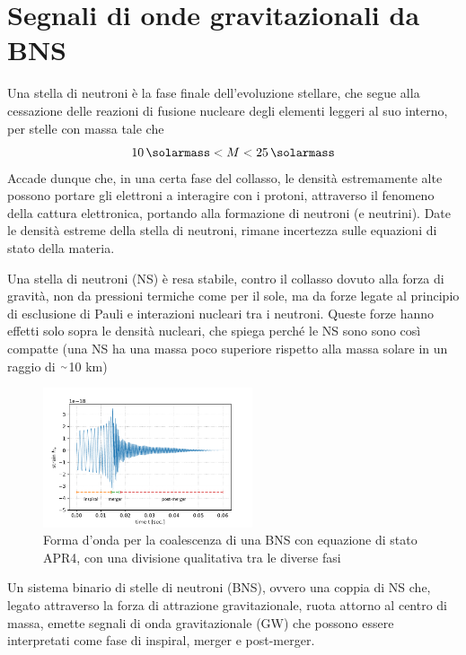 \chapter[Segnali di GW da BNS]{Segnali di onde gravitazionali da BNS}
\label{chapter:segnaleGWdaBNS}
Una stella di neutroni è la fase finale dell'evoluzione stellare, che segue alla cessazione delle reazioni di fusione nucleare degli elementi leggeri al suo interno, per stelle con massa tale che
\begin{equation}
   	\SI{10}{\solarmass} < M < \SI{25}{\solarmass}
   	\label{eqn:massNS}
\end{equation}
Accade dunque che, in una certa fase del collasso, le densità estremamente alte possono portare gli elettroni a interagire con i protoni, attraverso il fenomeno della cattura elettronica, portando alla formazione di neutroni (e neutrini). Date le densità estreme della stella di neutroni, rimane incertezza sulle equazioni di stato della materia.\cite{hobson2006general}

Una stella di neutroni (NS) è resa stabile, contro il collasso dovuto alla forza di gravità, non da pressioni termiche come per il sole, ma da forze legate al principio di esclusione di Pauli e interazioni nucleari tra i neutroni. Queste forze hanno effetti solo sopra le densità nucleari, che spiega perché le NS sono sono così compatte (una NS ha una massa poco superiore rispetto alla massa solare in un raggio di $\smallsim$10 km)\cite{hartle2003gravity}
\begin{figure}
	\vspace{-15pt}
	\begin{center}
		\includegraphics[width=0.55\textwidth]{figures/Capitolo_1/APR4.pdf}
	\end{center}
	\vspace{-10pt}
	\caption{Forma d'onda per la coalescenza di una BNS con equazione di stato APR4, con una divisione qualitativa tra le diverse fasi}
	\label{fig:forma_onda_APR4}
	\vspace{-10pt}
\end{figure}
Un sistema binario di stelle di neutroni (BNS), ovvero una coppia di NS che, legato attraverso la forza di attrazione gravitazionale, ruota attorno al centro di massa, emette segnali di onda gravitazionale (GW) che possono essere interpretati come fase di inspiral, merger e post-merger.

